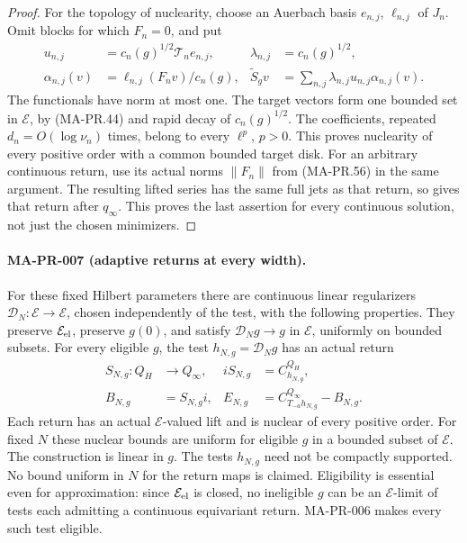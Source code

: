 \begin{proof}
For the topology of nuclearity, choose an Auerbach
basis \(e_{n,j}\), \(\ell_{n,j}\) of \(J_n\).
Omit blocks for which \(F_n=0\), and put
\[
 \begin{aligned}
 u_{n,j}&=c_n(g)^{1/2}\mathcal T_ne_{n,j},&
 \lambda_{n,j}&=c_n(g)^{1/2},\\
 \alpha_{n,j}(v)&=\ell_{n,j}(F_nv)/c_n(g),&
 \widetilde S_gv&=\sum_{n,j}
                 \lambda_{n,j}u_{n,j}\alpha_{n,j}(v).
 \end{aligned}
 \tag{MA-PR.59}
\]
The functionals have norm at most one.
The target vectors form one bounded set in \(\mathcal E\),
by (MA-PR.44) and rapid decay of \(c_n(g)^{1/2}\).
The coefficients, repeated \(d_n=O(\log\nu_n)\) times,
belong to every \(\ell^p\), \(p>0\).
This proves nuclearity of every positive order with
a common bounded target disk.
For an arbitrary continuous return, use its actual
norms \(\|F_n\|\) from (MA-PR.56) in the same argument.
The resulting lifted series has the same full jets
as that return, so gives that return after \(q_\infty\).
This proves the last assertion for every continuous
solution, not just the chosen minimizers.
\end{proof}

\paragraph{MA-PR-007 (adaptive returns at every width).}
For these fixed Hilbert parameters there are continuous
linear regularizers
\(\mathcal D_N:\mathcal E\to\mathcal E\), chosen
independently of the test, with the following properties.
They preserve \(\mathcal E_{\rm el}\), preserve \(g(0)\),
and satisfy \(\mathcal D_Ng\to g\) in \(\mathcal E\),
uniformly on bounded subsets.
For every eligible \(g\), the test
\(h_{N,g}=\mathcal D_Ng\) has an actual return
\[
 \begin{aligned}
 S_{N,g}:Q_H&\longrightarrow Q_\infty,&
 iS_{N,g}&=C_{h_{N,g}}^{Q_H},\\
 B_{N,g}&=S_{N,g}i,&
 E_{N,g}&=C_{T_{-a}h_{N,g}}^{Q_\infty}-B_{N,g}.
 \end{aligned}
 \tag{MA-PR.60}
\]
Each return has an actual \(\mathcal E\)-valued lift
and is nuclear of every positive order.
For fixed \(N\) these nuclear bounds are uniform for
eligible \(g\) in a bounded subset of \(\mathcal E\).
The construction is linear in \(g\).
The tests \(h_{N,g}\) need not be compactly supported.
No bound uniform in \(N\) for the return maps is claimed.
Eligibility is essential even for approximation: since
\(\mathcal E_{\rm el}\) is closed, no ineligible \(g\)
can be an \(\mathcal E\)-limit of tests each admitting
a continuous equivariant return.  MA-PR-006 makes
every such test eligible.

